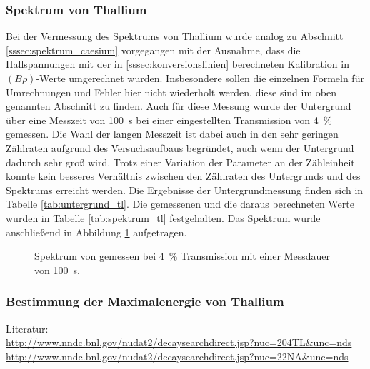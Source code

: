 \documentclass[11pt, a4paper]{article}
\numberwithin{equation}{section}
\begin{document}
\subsubsection{Spektrum von Thallium}
\begin{table}
	\centering
	
	\caption{Untergrundmessung von  mit einer Messdauer von \SI{100}{\second} bei eingestellter Transmission von \SI{4}{\percent}.}
	\label{tab:untergrund_tl}
\end{table}
Bei der Vermessung des Spektrums von Thallium wurde analog zu Abschnitt \ref{sssec:spektrum_caesium} vorgegangen mit der Ausnahme, dass die Hallspannungen mit der in \ref{sssec:konversionslinien} berechneten Kalibration in $(B \rho)$-Werte umgerechnet wurden.
Insbesondere sollen die einzelnen Formeln für Umrechnungen und Fehler hier nicht wiederholt werden, diese sind im oben genannten Abschnitt zu finden.
Auch für diese Messung wurde der Untergrund über eine Messzeit von \SI{100}{\second} bei einer eingestellten Transmission von \SI{4}{\percent} gemessen.
Die Wahl der langen Messzeit ist dabei auch in den sehr geringen Zählraten aufgrund des Versuchsaufbaus begründet, auch wenn der Untergrund dadurch sehr groß wird.
Trotz einer Variation der Parameter an der Zähleinheit konnte kein besseres Verhältnis zwischen den Zählraten des Untergrunds und des Spektrums erreicht werden.
Die Ergebnisse der Untergrundmessung finden sich in Tabelle \ref{tab:untergrund_tl}.
Die gemessenen und die daraus berechneten Werte wurden in Tabelle \ref{tab:spektrum_tl} festgehalten.
Das Spektrum wurde anschließend in Abbildung \ref{fig:thallium_spectrum} aufgetragen.
\begin{figure}[h]
	\centering
	
	\caption{Spektrum von  gemessen bei \SI{4}{\percent} Transmission mit einer Messdauer von \SI{100}{\second}.}
	\label{fig:thallium_spectrum}
\end{figure}

\subsubsection{Bestimmung der Maximalenergie von Thallium}

Literatur:\\
\url{http://www.nndc.bnl.gov/nudat2/decaysearchdirect.jsp?nuc=204TL&unc=nds}\\
\url{http://www.nndc.bnl.gov/nudat2/decaysearchdirect.jsp?nuc=22NA&unc=nds}\\
\end{document}
